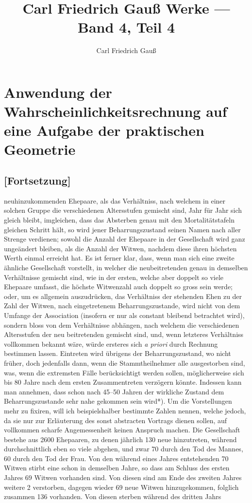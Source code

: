 \documentclass[12pt,a4paper]{article}
\title{Carl Friedrich Gau\ss{} Werke --- Band 4, Teil 4}
\author{Carl Friedrich Gau\ss}
\date{}
\begin{document}
\maketitle
\thispagestyle{empty}

\section*{Anwendung der Wahrscheinlichkeitsrechnung auf eine Aufgabe der praktischen Geometrie}

\subsection*{[Fortsetzung]}

neuhinzukommenden Ehepaare, als das Verhältniss, nach welchem in einer solchen Gruppe die verschiedenen Altersstufen gemischt sind, Jahr für Jahr sich gleich bleibt, imgleichen, dass das Absterben genau mit den Mortalitätstafeln gleichen Schritt hält, so wird jener Beharrungszustand seinen Namen nach aller Strenge verdienen; sowohl die Anzahl der Ehepaare in der Gesellschaft wird ganz ungeändert bleiben, als die Anzahl der Witwen, nachdem diese ihren höchsten Werth einmal erreicht hat. Es ist ferner klar, dass, wenn man sich eine zweite ähnliche Gesellschaft vorstellt, in welcher die neubeitretenden genau in demselben Verhältnisse gemischt sind, wie in der ersten, welche aber doppelt so viele Ehepaare umfasst, die höchste Witwenzahl auch doppelt so gross sein werde; oder, um es allgemein auszudrücken, das Verhältniss der stehenden Ehen zu der Zahl der Witwen, nach eingetretenem Beharrungszustande, wird nicht von dem Umfange der Association (insofern er nur als constant bleibend betrachtet wird), sondern bloss von dem Verhältnisse abhängen, nach welchem die verschiedenen Altersstufen der neu beitretenden gemischt sind, und, wenn letzteres Verhältniss vollkommen bekannt wäre, würde ersteres sich \textit{a priori} durch Rechnung bestimmen lassen. Eintreten wird übrigens der Beharrungszustand, wo nicht früher, doch jedenfalls dann, wenn die Stammtheilnehmer alle ausgestorben sind, was, wenn die extremsten Fälle berücksichtigt werden sollen, möglicherweise sich bis 80 Jahre nach dem ersten Zusammentreten verzögern könnte. Indessen kann man annehmen, dass schon nach 45--50 Jahren der wirkliche Zustand dem Beharrungszustande sehr nahe gekommen sein wird{}*). Um die Vorstellungen mehr zu fixiren, will ich beispielshalber bestimmte Zahlen nennen, welche jedoch, da sie nur zur Erläuterung des sonst abstracten Vortrags dienen sollen, auf vollkommen scharfe Angemessenheit keinen Anspruch machen. Die Gesellschaft bestehe aus 2600 Ehepaaren, zu denen jährlich 130 neue hinzutreten, während durchschnittlich eben so viele abgehen, und zwar 70 durch den Tod des Mannes, 60 durch den Tod der Frau. Von den während eines Jahres entstehenden 70 Witwen stirbt eine schon in demselben Jahre, so dass am Schluss des ersten Jahres 69 Witwen vorhanden sind. Von diesen sind am Ende des zweiten Jahres weitere 2 verstorben, dagegen wieder 69 neue Witwen hinzugekommen, folglich zusammen 136 vorhanden. Von diesen sterben während des dritten Jahrs 
\end{document}
